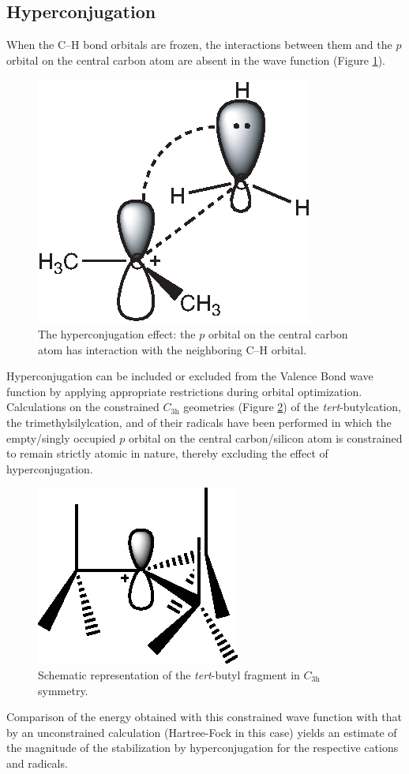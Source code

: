 \subsection{Hyperconjugation}

When the C--H bond orbitals are frozen, the interactions between them and the $p$ orbital on the central carbon atom are absent in the wave function (Figure \ref{ch3.fig.hyperconjugation}).
\begin{figure}[ht]
\center
\includegraphics{dissociation/figures/hyperconj.eps}
\caption{The hyperconjugation effect: the $p$ orbital on the central carbon atom has interaction with the neighboring C--H orbital.}
\label{ch3.fig.hyperconjugation}
\end{figure}

Hyperconjugation can be included or excluded from the Valence Bond wave function by applying appropriate restrictions during orbital optimization.  Calculations on the constrained $C_\mathrm{3h}$ geometries (Figure \ref{ch3.fig.c3h}) of the \textit{tert}-butylcation, the trimethylsilylcation, and of their radicals have been performed in which the empty/singly occupied $p$ orbital on the central carbon/silicon atom is constrained to remain strictly atomic in nature, thereby excluding the effect of hyperconjugation.
\begin{figure}[ht]
\center
\includegraphics{dissociation/figures/c3h.eps}
\caption{Schematic representation of the \textit{tert}-butyl fragment in $C_\mathrm{3h}$ symmetry.}
\label{ch3.fig.c3h}
\end{figure}
Comparison of the energy obtained with this constrained wave function with that by an unconstrained calculation  (Hartree-Fock in this case) yields an estimate of the magnitude of the stabilization by hyperconjugation for the respective cations and radicals. 

